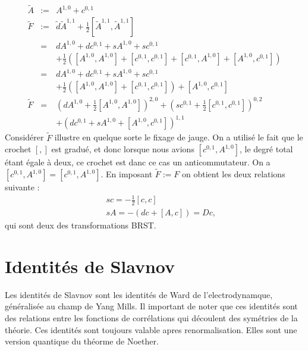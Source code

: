 \documentclass[a4paper,11pt]{article}
\theoremstyle{plain}
\theoremstyle{definition}
\theoremstyle{remark}
\numberwithin{equation}{section}
\numberwithin{equation}{subsection}
\numberwithin{figure}{section}
\begin{document}
\begin{eqnarray}
 \tilde{A}  &:=& A^{1,0} + c^{0,1}\\
 \tilde{F}  &:=& \tilde{d} \tilde{A}^{1,1} + \frac{1}{2} \left[ \tilde{A}^{1,1} , \tilde{A}^{1,1} \right]\\
            &=& dA^{1,0} + dc^{0,1} + sA^{1,0} + sc^{0,1} \nonumber \\ &&  
+ \frac{1}{2} \left( [A^{1,0},A^{1,0}] + [c^{0,1},c^{0,1}] + [c^{0,1},A^{1,0}]  + [A^{1,0},c^{0,1}] \right) \\ 
            &=& dA^{1,0} + dc^{0,1} + sA^{1,0} + sc^{0,1} \nonumber \\ &&  
+ \frac{1}{2} \left( [A^{1,0},A^{1,0}] + [c^{0,1},c^{0,1}]  \right) +  [A^{1,0},c^{0,1}] \\ 
 \tilde{F}  &=& \left( dA^{1,0} + \frac{1}{2}[A^{1,0},A^{1,0}] \right)^{2,0}  
+ \left( sc^{0,1} + \frac{1}{2} [c^{0,1},c^{0,1}] \right)^{0,2}   \nonumber \\ 
&& + \left( dc^{0,1} + sA^{1,0} + [A^{1,0},c^{0,1}] \right)^{1,1}
\end{eqnarray}
Considérer $\tilde{F}$ illustre en quelque sorte le fixage de jauge. On a utilisé le fait que le crochet $[,]$ est gradué, et donc lorsque 
nous avions $[c^{0,1},A^{1,0}]$, le degré total étant égale à deux, ce crochet est danc ce cas un anticommutateur. 
On a  $[c^{0,1},A^{1,0}] =  [c^{0,1},A^{1,0}]$. En imposant   $\tilde{F} := F$ on obtient les deux relations suivante :
\begin{eqnarray}
  && sc = - \frac{1}{2} \left[ c , c \right] \\
  && sA = - \left( dc + [A,c] \right) = Dc ,
\end{eqnarray}
qui sont deux des transformations BRST.

\section{Identités de Slavnov}

\noindent
Les identités de Slavnov sont les identités de Ward de l'electrodynamque, généralisée au champ de Yang Mills. 
Il important de noter que ces identités sont des relations entre les fonctions de corrélations qui découlent des symétries de la théorie. 
Ces identités sont toujours valable apres renormalisation. Elles sont une version quantique du théorme de Noether.\\
\end{document}
